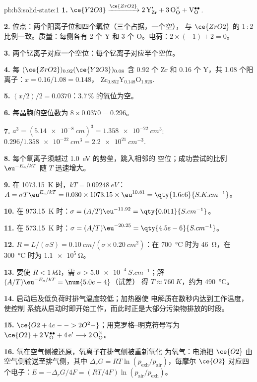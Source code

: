 \begin{solution}{pb:b3:solid-state:1}
\textbf{1.} $\ce{Y2O3} \xrightarrow{\ce{ZrO2}} \mathrm{2\,Y_{Zr}' + 3\,O_O^{\times} + V_O^{\bullet\bullet}}$.

\textbf{2.} 位点：两个阳离子位和四个氧位（三个占据，一个空），
与 $\ce{ZrO2}$ 的 1\,:\,2 比例一致。质量：每侧各有 2 个 Y 和 3 个 O。电荷：$2 \times (-1) + 2 = 0$。

\textbf{3.} 两个钇离子对应一个空位：每个钇离子对应半个空位。

\textbf{4.} 每 $(\ce{ZrO2})_{0.92}(\ce{Y2O3})_{0.08}$ 含 0.92 个 Zr 和 0.16 个 Y，共 1.08 个阳离子：$x = 0.16/1.08 = 0.148$，
$\mathrm{Zr_{0.852}Y_{0.148}O_{1.926}}$.

\textbf{5.} $(x/2)/2 = 0.0370$：3.7\,\% 的氧位为空。

\textbf{6.} 每晶胞的空位数为 $8 \times 0.0370 = 0.296$。

\textbf{7.} $a^3 = (\qty{5.14e-8}{cm})^3 = \qty{1.358e-22}{cm^3}$: $0.296/\qty{1.358e-22}{cm^3} = \qty{2.2e21}{cm^{-3}}$.

\textbf{8.} 每个氧离子须越过 \qty{1.0}{eV} 的势垒，跳入相邻的
空位；成功尝试的比例 $\eu^{-E_a/kT}$ 随 $T$ 迅速增大。

\textbf{9.} 在 \qty{1073.15}{K} 时，$kT = \qty{0.09248}{eV}$：$A = \sigma T\eu^{E_a/kT} = 0.030 \times 1073.15 \times \eu^{10.81} = \qty{1.6e6}{S.K.cm^{-1}}$。

\textbf{10.} 在 \qty{973.15}{K} 时：$\sigma = (A/T)\eu^{-11.92} = \qty{0.011}{S.cm^{-1}}$。

\textbf{11.} 在 \qty{573.15}{K} 时：$\sigma = (A/T)\eu^{-20.25} = \qty{4.5e-6}{S.cm^{-1}}$。

\textbf{12.} $R = L/(\sigma S) = \qty{0.10}{cm}/(\sigma \times \qty{0.20}{cm^2})$：在 \qty{700}{\celsius} 时为 \qty{46}{\ohm}，在 \qty{300}{\celsius} 时为 $\qty{1.1e5}{\ohm}$。

\textbf{13.} 要使 $R < \qty{1}{k\ohm}$，需 $\sigma > \qty{5.0e-4}{S.cm^{-1}}$；解 $(A/T)\eu^{-E_a/kT} = \num{5.0e-4}$（试差）
得 $T \approx \qty{760}{K}$，约为 \qty{490}{\celsius}。

\textbf{14.} 启动后及低负荷时排气温度较低；加热器使
电解质在数秒内达到工作温度，使控制
系统从启动时即开始工作，而此时正是大部分污染物排放的时段。

\textbf{15.} $\ce{O2 + 4e- -> 2O^2-}$；用克罗格–明克符号写为 $\ce{O2} + \mathrm{2\,V_O^{\bullet\bullet} + 4\,e'} \longrightarrow \mathrm{2\,O_O^{\times}}$。

\textbf{16.} 氧在空气侧被还原，氧离子在排气侧被重新氧化
为氧气：电池把 $\ce{O2}$ 由空气侧输送至排气侧，其中
$\Delta_rG = RT\ln(p_{\mathrm{exh}}/p_{\mathrm{air}})$，每摩尔 $\ce{O2}$ 对应四个电子：$E = -\Delta_rG/4F = (RT/4F)\ln(p_{\mathrm{air}}/p_{\mathrm{exh}})$。


\end{solution}
